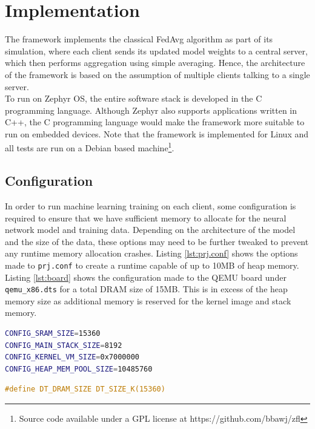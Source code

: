 \documentclass[12pt]{article}
\begin{document}
\pagebreak
\section{Implementation}\label{implementation}
The framework implements the classical FedAvg algorithm\cite{brendan_2016_communicationefficient} as part of
its simulation, where each client sends its updated model weights to a central server, which then performs aggregation
using simple averaging. Hence, the architecture of the framework is based on the assumption of
multiple clients talking to a single server.\\

To run on Zephyr OS, the entire software stack is developed in the C programming language. Although
Zephyr also supports applications written in C++, the C programming language would make the framework
more suitable to run on embedded devices. Note that the framework is implemented for Linux and all tests are run
on a Debian based machine\footnote{Source code available under a
GPL license at https://github.com/bbawj/zfl}.

\subsection{Configuration}
In order to run machine learning training on each client, some configuration is required to ensure
that we have sufficient memory to allocate for the neural network model and training data. Depending
on the architecture of the model and the size of the data, these options may need to be further tweaked to
prevent any runtime memory allocation crashes. Listing \ref{lst:prj.conf} shows the options made to
\verb|prj.conf| to create a runtime capable of up to 10MB of heap memory. Listing
\ref{lst:board} shows
the configuration made to the QEMU board under \verb|qemu_x86.dts| for a total DRAM size of 15MB.
This is in excess of the heap memory size as additional memory is reserved for the kernel image and
stack memory.\\

\begin{minipage}[b][][b]{.45\textwidth}
\begin{lstlisting}[language=bash,caption={Zephyr prj.conf},label={lst:prj.conf}]
CONFIG_SRAM_SIZE=15360
CONFIG_MAIN_STACK_SIZE=8192
CONFIG_KERNEL_VM_SIZE=0x7000000
CONFIG_HEAP_MEM_POOL_SIZE=10485760
\end{lstlisting}
\end{minipage}\hfill
\begin{minipage}[b][][b]{.45\textwidth}
\begin{lstlisting}[language=C,caption={QEMU board.dts},label={lst:board}]
#define DT_DRAM_SIZE DT_SIZE_K(15360)
\end{lstlisting}
\end{minipage}
\end{document}
